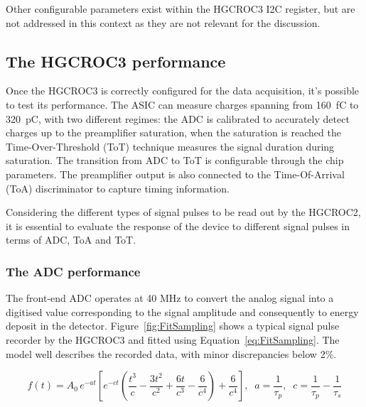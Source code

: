 \bigbreak

Other configurable parameters exist within the HGCROC3 I2C register, but are not addressed in this context as they are not relevant for the discussion.

\subsection{The HGCROC3 performance}
\label{subsec:The HGCROC3 performance}

Once the HGCROC3 is correctly configured for the data acquisition, it's possible to test its performance.
The ASIC can measure charges spanning from 160~fC to 320~pC, with two different regimes: the ADC is calibrated to accurately detect charges up to the preamplifier saturation, when the saturation is reached the Time-Over-Threshold (ToT) technique measures the signal duration during saturation. The transition from ADC to ToT is configurable through the chip parameters. The preamplifier output is also connected to the Time-Of-Arrival (ToA) discriminator to capture timing information. 

Considering the different types of signal pulses to be read out by the HGCROC2, it is essential to evaluate the response of the device to different signal pulses in terms of ADC, ToA and ToT.

\subsubsection{The ADC performance}
\label{subsubsec:The ADC performance}

The front-end ADC operates at 40 MHz to convert the analog signal into a digitised value corresponding to the signal amplitude and consequently to energy deposit in the detector. 
Figure~\ref{fig:FitSampling} shows a typical signal pulse recorder by the HGCROC3 and fitted using Equation~\ref{eq:FitSampling}. The model well describes the recorded data, with minor discrepancies below 2\%.

\begin{equation}
    f(t) = A_{0}\,e^{-at}\left[e^{-ct}\left(\frac{t^3}{c}-\frac{3t^2}{c^2}+\frac{6t}{c^3}-\frac{6}{c^4}\right)+\frac{6}{c^4}\right], \;\; a =\frac{1}{\tau_{p}}, \;\; c=\frac{1}{\tau_{p}}-\frac{1}{\tau_{s}}
\label{eq:FitSampling}
\end{equation}

